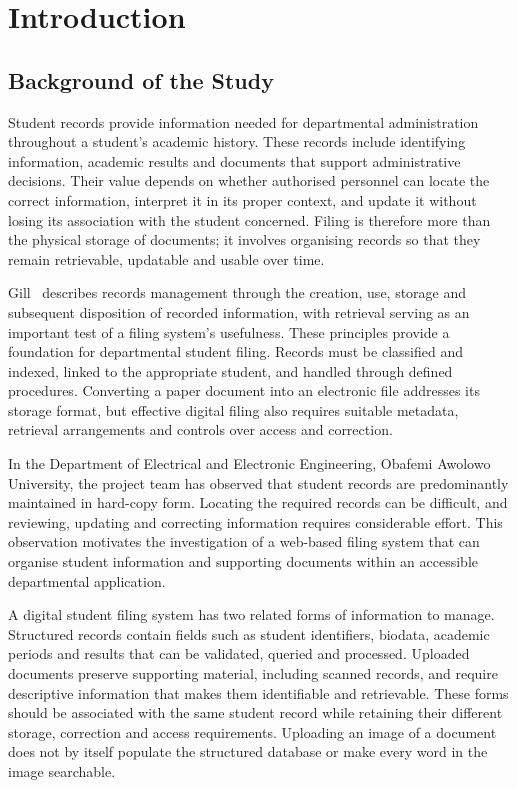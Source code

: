 \chapter{Introduction}\label{chap:1}

\section{Background of the Study}\label{sec:1-1}

Student records provide information needed for departmental administration throughout a student's academic history. These records include identifying information, academic results and documents that support administrative decisions. Their value depends on whether authorised personnel can locate the correct information, interpret it in its proper context, and update it without losing its association with the student concerned. Filing is therefore more than the physical storage of documents; it involves organising records so that they remain retrievable, updatable and usable over time.

Gill~\cite[pp. 3-6]{gill1993} describes records management through the creation, use, storage and subsequent disposition of recorded information, with retrieval serving as an important test of a filing system's usefulness. These principles provide a foundation for departmental student filing. Records must be classified and indexed, linked to the appropriate student, and handled through defined procedures. Converting a paper document into an electronic file addresses its storage format, but effective digital filing also requires suitable metadata, retrieval arrangements and controls over access and correction.

In the Department of Electrical and Electronic Engineering, Obafemi Awolowo University, the project team has observed that student records are predominantly maintained in hard-copy form. Locating the required records can be difficult, and reviewing, updating and correcting information requires considerable effort. This observation motivates the investigation of a web-based filing system that can organise student information and supporting documents within an accessible departmental application.

A digital student filing system has two related forms of information to manage. Structured records contain fields such as student identifiers, biodata, academic periods and results that can be validated, queried and processed. Uploaded documents preserve supporting material, including scanned records, and require descriptive information that makes them identifiable and retrievable. These forms should be associated with the same student record while retaining their different storage, correction and access requirements. Uploading an image of a document does not by itself populate the structured database or make every word in the image searchable.

